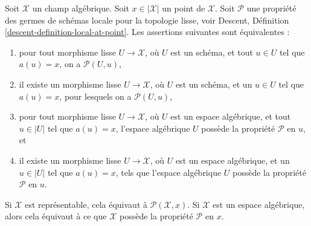 \begin{lemma}
\label{lemma-local-source-target-at-point}
Soit $\mathcal{X}$ un champ algébrique.
Soit $x \in |\mathcal{X}|$ un point de $\mathcal{X}$.
Soit $\mathcal{P}$ une propriété des germes de schémas locale pour la topologie lisse, voir
Descent, Définition \ref{descent-definition-local-at-point}.
Les assertions suivantes sont équivalentes :
\begin{enumerate}
\item pour tout morphisme lisse $U \to \mathcal{X}$, où $U$ est un schéma,
et tout $u \in U$ tel que $a(u) = x$, on a $\mathcal{P}(U, u)$,
\item il existe un morphisme lisse $U \to \mathcal{X}$, où $U$ est un schéma,
et un $u \in U$ tel que $a(u) = x$, pour lesquels on a $\mathcal{P}(U, u)$,
\item pour tout morphisme lisse $U \to \mathcal{X}$, où $U$ est un espace algébrique,
et tout $u \in |U|$ tel que $a(u) = x$, l'espace algébrique $U$ possède la propriété
$\mathcal{P}$ en $u$, et
\item il existe un morphisme lisse $U \to \mathcal{X}$, où $U$ est un
espace algébrique, et un $u \in |U|$ tel que $a(u) = x$, tels que l'espace algébrique
$U$ possède la propriété $\mathcal{P}$ en $u$.
\end{enumerate}
Si $\mathcal{X}$ est représentable, cela équivaut à
$\mathcal{P}(\mathcal{X}, x)$. Si $\mathcal{X}$ est un espace algébrique, alors
cela équivaut à ce que $\mathcal{X}$ possède la propriété $\mathcal{P}$ en $x$.
\end{lemma}

